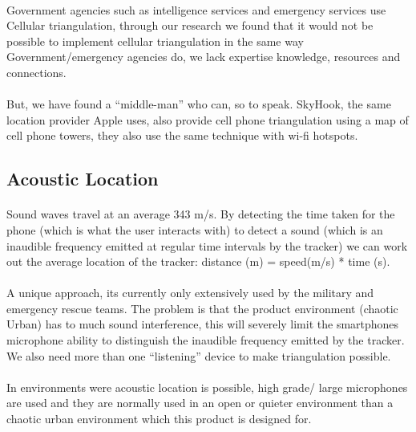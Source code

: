 \documentclass[12pt,a4paper]{article}
\begin{document}
\begin{appendices}
      \paragraph{}
      Government agencies such as intelligence services and emergency services use Cellular triangulation, through our research we found that it would not be possible to implement cellular triangulation in the same way Government/emergency agencies do, we lack expertise knowledge, resources and connections.
      \paragraph{}
      But, we have found a “middle-man” who can, so to speak. SkyHook, the same location provider Apple uses, also provide cell phone triangulation using a map of cell phone towers, they also use the same technique with wi-fi hotspots.
    
    \subsection{Acoustic Location}
      \paragraph{}
        Sound waves travel at an average 343 m/s. By detecting the time taken for the phone (which is what the user interacts with) to detect a sound (which is an inaudible frequency emitted at regular time intervals by the tracker) we can work out the average location of the tracker: distance (m) = speed(m/s) * time (s).
      \paragraph{}
        A unique approach, its currently only extensively used by the military and emergency rescue teams. The problem is that the product environment (chaotic Urban) has to much sound interference, this will severely limit the smartphones microphone ability to distinguish the inaudible frequency emitted by the tracker. We also need more than one “listening” device to make triangulation possible.
      \paragraph{}
        In environments were acoustic location is possible, high grade/ large microphones are used and they are normally used in an open or quieter environment than a chaotic urban environment which this product is designed for.


\end{appendices}
\end{document}
